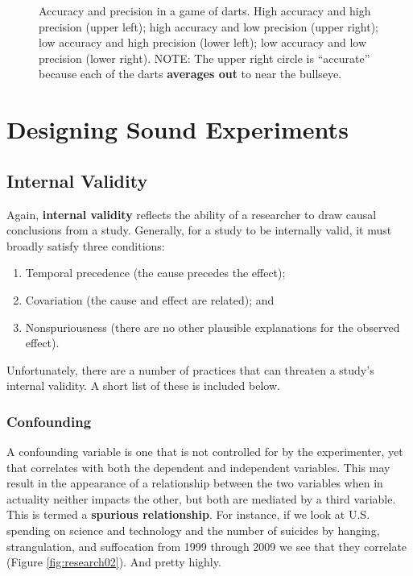 \begin{figure*}[htp]
\caption{Accuracy and precision in a game of darts. High accuracy and high precision (upper left); high accuracy and low precision (upper right); low accuracy and high precision (lower left); low accuracy and low precision (lower right). NOTE: The upper right circle is ``accurate'' because each of the darts \textbf{averages out} to near the bullseye.}
\label{fig:research01}
\end{figure*}

\section{Designing Sound Experiments}

\subsection{Internal Validity}
Again, \textbf{internal validity} reflects the ability of a researcher to draw causal conclusions from a study. Generally, for a study to be internally valid, it must broadly satisfy three conditions:

\begin{enumerate}
  \item Temporal precedence (the cause precedes the effect);
  \item Covariation (the cause and effect are related); and
  \item Nonspuriousness (there are no other plausible explanations for the observed effect).
\end{enumerate}

Unfortunately, there are a number of practices that can threaten a study's internal validity. A short list of these is included below.

\subsubsection{Confounding}
A confounding variable is one that is not controlled for by the experimenter, yet that correlates with both the dependent and independent variables. This may result in the appearance of a relationship between the two variables when in actuality neither impacts the other, but both are mediated by a third variable. This is termed a \textbf{spurious relationship}. For instance, if we look at U.S. spending on science and technology and the number of suicides by hanging, strangulation, and suffocation from 1999 through 2009 we see that they correlate (Figure \ref{fig:research02}). And pretty highly. 

